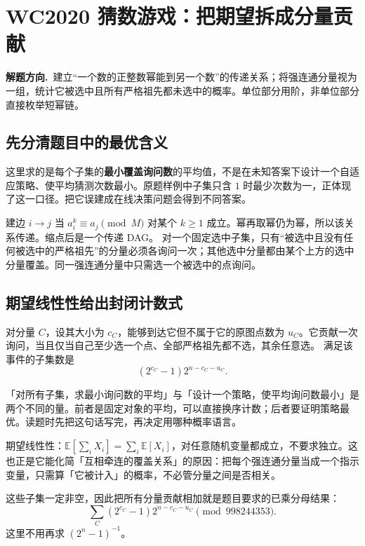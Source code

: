 \documentclass[UTF8,a4paper,11pt,twoside,openright,fontset=fandol]{ctexbook}
\theoremstyle{definition}
\newcommand{\hint}{\par\noindent\textbf{解题方向.}\ }
\begin{document}
\section{WC2020 猜数游戏：把期望拆成分量贡献}
\hint 建立“一个数的正整数幂能到另一个数”的传递关系；将强连通分量视为一组，统计它被选中且所有严格祖先都未选中的概率。单位部分用阶，非单位部分直接枚举短幂链。

\subsection{先分清题目中的最优含义}
这里求的是每个子集的\textbf{最小覆盖询问数}的平均值，不是在未知答案下设计一个自适应策略、使平均猜测次数最小。原题样例中子集只含 $1$ 时最少次数为一，正体现了这一口径。把它误建成在线决策问题会得到不同答案。

建边 $i\to j$ 当 $a_i^k\equiv a_j\pmod M$ 对某个 $k\ge1$ 成立。幂再取幂仍为幂，所以该关系传递。缩点后是一个传递 DAG。
对一个固定选中子集，只有“被选中且没有任何被选中的严格祖先”的分量必须各询问一次；其他选中分量都由某个上方的选中分量覆盖。同一强连通分量中只需选一个被选中的点询问。

\subsection{期望线性性给出封闭计数式}
对分量 $C$，设其大小为 $c_C$，能够到达它但不属于它的原图点数为 $u_C$。它贡献一次询问，当且仅当自己至少选一个点、全部严格祖先都不选，其余任意选。
满足该事件的子集数是
\[
 (2^{c_C}-1)2^{n-c_C-u_C}.
\]

\begin{tip}
「对所有子集，求最小询问数的平均」与「设计一个策略，使平均询问数最小」是两个不同的量。前者是固定对象的平均，可以直接换序计数；后者要证明策略最优。读题时先把这句话写完，再决定用哪种概率语言。
\end{tip}

\begin{tip}[为什么不需要「独立」]
期望线性性：$\mathbb E[\sum_iX_i]=\sum_i\mathbb E[X_i]$，对任意随机变量都成立，不要求独立。这也正是它能化简「互相牵连的覆盖关系」的原因：把每个强连通分量当成一个指示变量，只需算「它被计入」的概率，不必管分量之间是否相关。
\end{tip}

这些子集一定非空，因此把所有分量贡献相加就是题目要求的已乘分母结果：
\[
 \boxed{\sum_C(2^{c_C}-1)2^{n-c_C-u_C}\pmod{998244353}}.
\]
这里不用再求 $(2^n-1)^{-1}$。
\end{document}
